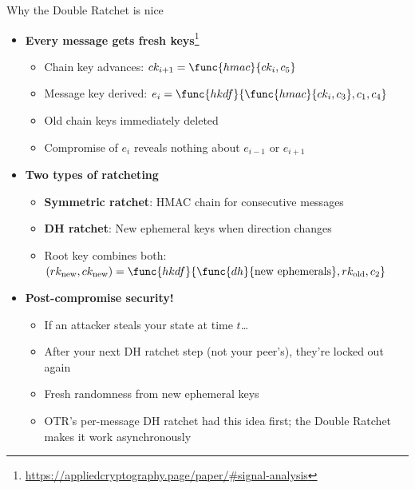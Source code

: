 \ifdefined\PRESENTATION\else\PassOptionsToClass{handout}{beamer}\fi\documentclass[aspectratio=169, lualatex]{beamer}
\begin{document}
\begin{frame}{Why the Double Ratchet is nice}
	\begin{itemize}
		\item \textbf{Every message gets fresh keys}\footnote{\url{https://appliedcryptography.page/paper/\#signal-analysis}}
		      \begin{itemize}
			      \item Chain key advances: $ck_{i+1} = \func{hmac}{ck_i, c_5}$
			      \item Message key derived: $e_i = \func{hkdf}{\func{hmac}{ck_i, c_3}, c_1, c_4}$
			      \item Old chain keys immediately deleted
			      \item Compromise of $e_i$ reveals nothing about $e_{i-1}$ or $e_{i+1}$
		      \end{itemize}
		\item \textbf{Two types of ratcheting}
		      \begin{itemize}
			      \item \textbf{Symmetric ratchet}: HMAC chain for consecutive messages
			      \item \textbf{DH ratchet}: New ephemeral keys when direction changes
			      \item Root key combines both: $(rk_{\text{new}}, ck_{\text{new}}) = \func{hkdf}{\func{dh}{\text{new ephemerals}}, rk_{\text{old}}, c_2}$
		      \end{itemize}
		\item \textbf{Post-compromise security!}
		      \begin{itemize}
			      \item If an attacker steals your state at time $t$\ldots
			      \item After your next DH ratchet step (not your peer's), they're locked out again
			      \item Fresh randomness from new ephemeral keys
			      \item OTR's per-message DH ratchet had this idea first; the Double Ratchet makes it work asynchronously
		      \end{itemize}
	\end{itemize}
\end{frame}
\end{document}
